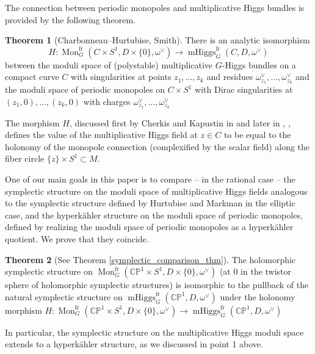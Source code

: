 \documentclass[11pt, oneside, reqno]{amsart}
\theoremstyle{definition} \newtheorem{definition}{Definition}[section]
\newtheorem{theorem}[definition]{Theorem}
\theoremstyle{definition} \newtheorem{remark}[definition]{Remark}
\theoremstyle{definition} \newtheorem{remarks}[definition]{Remarks}
\theoremstyle{definition} \newtheorem{question}[definition]{Question}
\theoremstyle{definition} \newtheorem*{note}{Note}
\theoremstyle{definition} \newtheorem{example}[definition]{Example}
\theoremstyle{definition} \newtheorem{examples}[definition]{Examples}
\newcommand{\bb}[1]{\mathbb{#1}}
\DeclareMathOperator{\mhiggs}{mHiggs}
\DeclareMathOperator{\mon}{Mon}
\newcommand{\fr}{\mathrm{fr}}
\begin{document}
The connection between periodic monopoles and multiplicative Higgs bundles is provided by the following theorem.
\begin{theorem}[Charbonneau--Hurtubise, Smith]
  There is an analytic isomorphism 
  \begin{equation*}
    H: \mon_G^\fr(C \times S^1,D \times\{0\},\omega^\vee) \to \mhiggs_G^{\text{fr}}(C,D,\omega^\vee)
  \end{equation*}
between the moduli space of (polystable) multiplicative $G$-Higgs bundles on a compact curve $C$ with singularities at points $z_1, \ldots, z_k$ and residues $\omega^\vee_{z_1}, \ldots, \omega^\vee_{z_k}$ and the moduli space of periodic monopoles on $C \times S^1$ with Dirac singularities at $(z_1,0), \ldots, (z_k,0)$ with charges $\omega^\vee_{z_1}, \ldots, \omega^\vee_{z_k}$
\end{theorem}

The morphism $H$,  discussed first by Cherkis and Kapustin in \cite{CherkisKapustin2} and later in
\cite{CharbonneauHurtubise}, \cite{Smith}, \cite{NekrasovPestun}
defines the value of the multiplicative Higgs field at $z \in C$ to be equal to
the holonomy of the monopole connection (complexified by the scalar field) along the fiber circle $\{z\} \times S^{1} \subset M$.

One of our main goals in this paper is to compare -- in the rational case -- the symplectic structure on the moduli space of multiplicative Higgs fields analogous to the symplectic structure defined by Hurtubise and Markman in the elliptic case, and the hyperk\"ahler structure on the moduli space of periodic monopoles, defined by realizing the moduli space of periodic monopoles as a hyperk\"ahler quotient.  We prove that they coincide.

\begin{theorem}[See Theorem \ref{symplectic_comparison_thm}]
  The holomorphic symplectic structure on
  $\mon_G^\fr(\bb{CP}^1 \times S^1,D \times\{0\},\omega^\vee)$ (at 0
  in the twistor sphere of holomorphic symplectic structures) 
  is isomorphic to the pullback of the natural symplectic structure on
  $\mhiggs_G^{\text{fr}}(\bb{CP}^1,D,\omega^\vee)$ under the
  holonomy morphism $H \colon \mon_G^\fr(\bb{CP}^1 \times S^1,D \times\{0\},\omega^\vee) \to \mhiggs_G^{\text{fr}}(\bb{CP}^1,D,\omega^\vee)$  
\end{theorem}

In particular, the symplectic structure on the multiplicative Higgs moduli space extends to a hyperk\"ahler structure, as we discussed in point 1 above.
\end{document}
